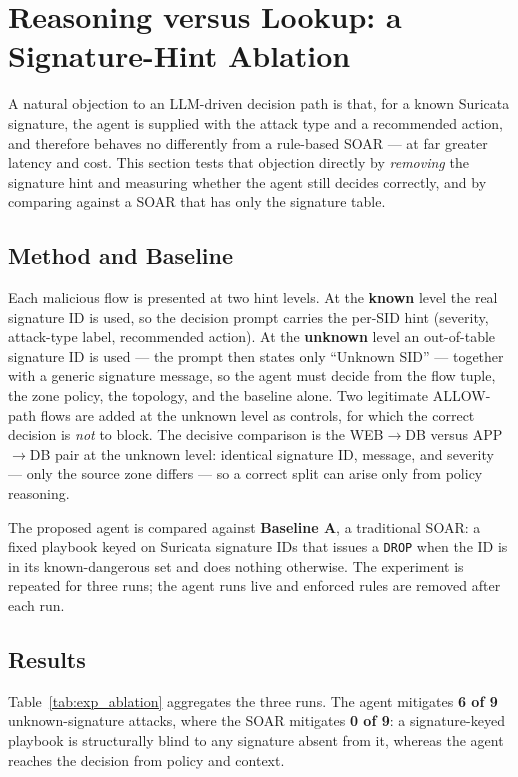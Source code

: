 \section{Reasoning versus Lookup: a Signature-Hint Ablation}
\label{sec:exp_ablation}

A natural objection to an LLM-driven decision path is that, for a known Suricata
signature, the agent is supplied with the attack type and a recommended action, and
therefore behaves no differently from a rule-based SOAR --- at far greater latency
and cost. This section tests that objection directly by \emph{removing} the
signature hint and measuring whether the agent still decides correctly, and by
comparing against a SOAR that has only the signature table.

\subsection{Method and Baseline}

Each malicious flow is presented at two hint levels. At the \textbf{known} level the
real signature ID is used, so the decision prompt carries the per-SID hint (severity,
attack-type label, recommended action). At the \textbf{unknown} level an
out-of-table signature ID is used --- the prompt then states only ``Unknown SID'' ---
together with a generic signature message, so the agent must decide from the flow
tuple, the zone policy, the topology, and the baseline alone. Two legitimate
ALLOW-path flows are added at the unknown level as controls, for which the correct
decision is \emph{not} to block. The decisive comparison is the WEB$\rightarrow$DB
versus APP$\rightarrow$DB pair at the unknown level: identical signature ID, message,
and severity --- only the source zone differs --- so a correct split can arise only
from policy reasoning.

The proposed agent is compared against \textbf{Baseline A}, a traditional SOAR: a
fixed playbook keyed on Suricata signature IDs that issues a \texttt{DROP} when the
ID is in its known-dangerous set and does nothing otherwise. The experiment is
repeated for three runs; the agent runs live and enforced rules are removed after
each run.

\subsection{Results}

Table~\ref{tab:exp_ablation} aggregates the three runs. The agent mitigates
\textbf{6 of 9} unknown-signature attacks, where the SOAR mitigates \textbf{0 of 9}:
a signature-keyed playbook is structurally blind to any signature absent from it,
whereas the agent reaches the decision from policy and context.

